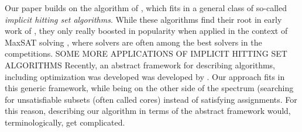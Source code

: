 Our paper builds on the algorithm of \citet{ignatiev2015smallest}, which fits in a general class of so-called \emph{implicit hitting set algorithms}.
While these algorithms find their root in early work of \citet{ai/Reiter87}, they only really boosted in popularity when applied in the context of MaxSAT solving \cite{DBLP:conf/cp/DaviesB11,davies,DBLP:conf/sat/DaviesB13}, where \hitsetbased solvers are often among the best solvers in the competitions. 
SOME MORE APPLICATIONS OF IMPLICIT HITTING SET ALGORITHMS
Recently, an abstract framework for describing \hitsetbased algorithms, including optimization was developed was developed by \citet{DBLP:conf/kr/SaikkoWJ16}. Our approach fits in this generic framework, while being on the other side of the spectrum (searching for unsatisfiable subsets (often called cores) instead of satisfying assignments. For this reason, describing our algorithm in terms of the abstract framework would, terminologically, get complicated. 


